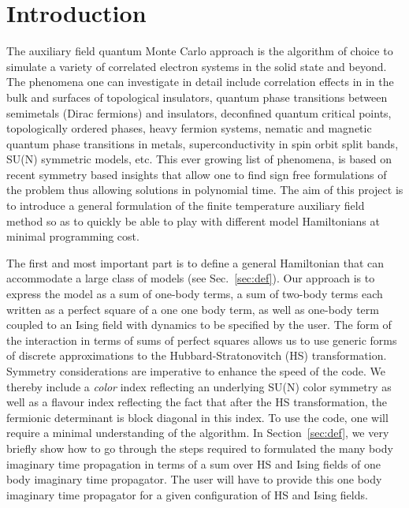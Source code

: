 \section{Introduction}\label{sec:intro}


The auxiliary field quantum Monte Carlo approach is the algorithm of choice to simulate a variety of correlated electron systems in the solid state and beyond.  The phenomena  one can investigate in detail include correlation effects in in the bulk and surfaces of topological insulators, quantum phase transitions between semimetals (Dirac fermions)  and insulators,  deconfined quantum critical points, topologically ordered phases, heavy fermion systems, nematic and magnetic quantum phase transitions in metals,   superconductivity in spin orbit split bands, SU(N) symmetric models,  etc.  This ever growing list of phenomena,  is based on  recent symmetry based insights that allow one to  find  sign free formulations of the  problem thus allowing solutions in polynomial time.    The aim of this project is to introduce a general formulation of the finite temperature  auxiliary field method  so as to quickly be able to play with different model Hamiltonians  at  minimal programming cost.  
	
		The first and most important  part is to define a general Hamiltonian  that  can  accommodate a large class of models  (see Sec.~\ref{sec:def}). Our approach is to express the model as a sum of one-body terms, a sum of two-body terms each written as a perfect square of a one one body term, as well as one-body  term  coupled to an Ising field with  dynamics to be specified by the user.   
The form of the interaction in terms of sums of perfect squares allows us to use generic forms of  discrete  approximations to the  Hubbard-Stratonovitch (HS)  transformation. 	 Symmetry considerations  are  imperative to enhance the speed of the code.   We thereby include a {\it color} index  reflecting  an underlying  SU(N) color symmetry as  well as a flavour index  reflecting  the fact that  after  the HS  transformation,  the  fermionic determinant is block diagonal in this index.    To use the code, one will require a minimal understanding of the algorithm.  In Section~\ref{sec:def}, we very briefly show how to go through  the steps required  to formulated the many body imaginary time propagation in terms of a sum  over HS and Ising fields  of one body  imaginary time propagator.   The user will have to provide this one body imaginary time propagator for a given configuration of   HS and  Ising fields.   
	  
